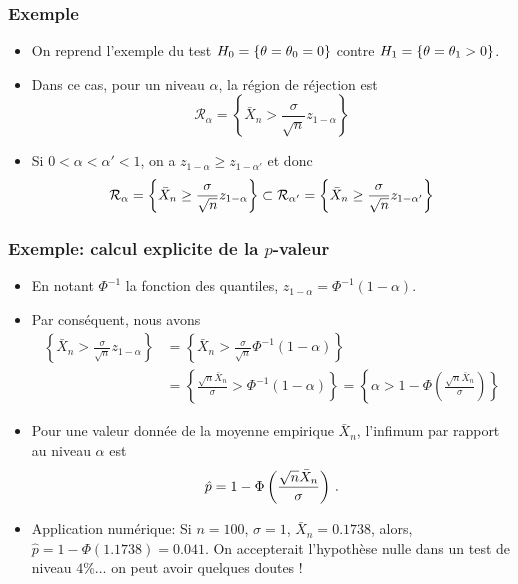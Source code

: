 \begin{frame}
\frametitle{Exemple}
\begin{itemize}
\item On reprend l'exemple du test $H_0= \{\theta= \theta_0= 0\}$ contre $H_1= \{ \theta= \theta_1 > 0\}$.
\item Dans ce cas, pour un niveau $\alpha$, la région de réjection est
\[
\mathcal{R}_\alpha = \left\{ \bar{X}_n  > \frac{\sigma}{\sqrt{n}} z_{1-\alpha} \right\}
\]
\item Si $0 < \alpha < \alpha' < 1$, on a $z_{1-\alpha} \geq z_{1 - \alpha'}$ et donc
\[
\mathcal{R}_\alpha = \left\{ \bar{X}_n \geq \frac{\sigma}{\sqrt{n}} z_{1-\alpha} \right\} \subset
\mathcal{R}_{\alpha'} = \left\{ \bar{X}_n \geq \frac{\sigma}{\sqrt{n}} z_{1-\alpha'} \right\}
\]
\end{itemize}
\end{frame}

\begin{frame}
\frametitle{Exemple: calcul explicite de la $p$-valeur}
\begin{itemize}
\item En notant $\Phi^{-1}$ la \alert{fonction des quantiles}, $z_{1-\alpha}= \Phi^{-1}(1-\alpha)$.
\item Par conséquent, nous avons
\begin{align*}
\left\{ \bar{X}_n > \frac{\sigma}{\sqrt{n}} z_{1-\alpha} \right\}
&= \left\{ \bar{X}_n > \frac{\sigma}{\sqrt{n}} \Phi^{-1}(1-\alpha) \right\} \\
&= \left\{ \frac{\sqrt{n} \bar{X}_n}{\sigma} >  \Phi^{-1}(1-\alpha) \right\} = \left\{ \alpha > 1 - \Phi\left( \frac{\sqrt{n} \bar{X}_n}{\sigma} \right) \right\}
\end{align*}
\item Pour une valeur donnée de la moyenne empirique $\bar{X}_n$, l'infimum par rapport au niveau $\alpha$ est
\[
\hat{p}= 1 - \Phi\left( \frac{\sqrt{n} \bar{X}_n}{\sigma} \right) \,.
\]
\item \alert{Application numérique:} Si $n=100$, $\sigma= 1$, $\bar{X}_n= 0.1738$, alors, $\hat{p}= 1 - \Phi(1.1738)= 0.041$. On accepterait l'hypothèse nulle dans un test de niveau $4\%$... on peut avoir quelques doutes !
\end{itemize}
\end{frame}



